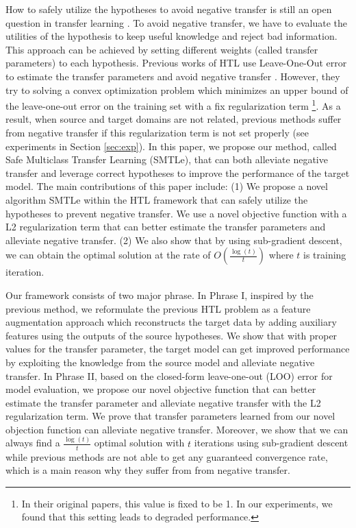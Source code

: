 How to safely utilize the hypotheses to avoid negative transfer is still an open question in transfer learning \cite{Lu201514}. To avoid negative transfer, we have to evaluate the utilities of the hypothesis to keep useful knowledge and reject bad information. This approach can be achieved by setting different weights (called transfer parameters) to each hypothesis.
Previous works of HTL use Leave-One-Out error to estimate the transfer parameters and avoid negative transfer \cite{tommasi2014learning} \cite{kuzborskij2013n}. However, they try to solving a convex
optimization problem which minimizes an upper bound of
the leave-one-out error on the training set with a fix regularization term \footnote{In their original papers, this value is fixed to be 1. In our experiments, we found that this setting leads to degraded performance.}. As a result, when source and target domains are not related, previous methods suffer from negative transfer if this regularization term is not set properly (see experiments in Section \ref{sec:exp}).
In this paper, we propose our method, {called Safe Multiclass Transfer Learning (SMTLe)}, that can both alleviate negative transfer and leverage correct hypotheses to improve the performance of the target model. 
The main contributions of this paper include: (1) We propose a novel algorithm SMTLe within the HTL framework that can safely utilize the hypotheses to prevent negative transfer. We use a novel objective function with a L2 regularization term that can better estimate the transfer parameters and alleviate negative transfer. (2) We also show that by using sub-gradient descent, we can obtain the optimal solution at the rate of $O(\frac{\log(t)}{t})$ where $t$ is training iteration.
 
Our framework consists of two major phrase. In Phrase I, inspired by the previous method, we reformulate the previous HTL problem as a feature augmentation approach which reconstructs the target data by adding auxiliary features using the outputs of the source hypotheses. We show that with proper values for the transfer parameter, the target model can get improved performance by exploiting the knowledge from the source model and alleviate negative transfer.
In Phrase II, 
based on the closed-form leave-one-out (LOO) error for model evaluation, we propose our novel objective function that can better estimate the transfer parameter and alleviate negative transfer with the L2 regularization term. We prove that transfer parameters learned from our novel objection function can alleviate negative transfer. Moreover, we show that we can always find a $\frac{\log(t)}{t}$ optimal solution with $t$ iterations using sub-gradient descent while previous methods are not able to get any guaranteed convergence rate, which is a main reason why they suffer from from negative transfer.

